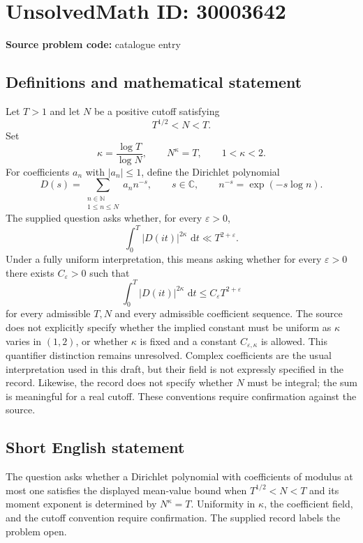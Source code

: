 \documentclass[11pt]{article}
\newcommand{\N}{\mathbb{N}}
\newcommand{\C}{\mathbb{C}}
\newcommand{\dd}{\,\mathrm{d}}
\begin{document}
\section*{UnsolvedMath ID: 30003642}
\textbf{Source problem code:} catalogue entry
\subsection{Definitions and mathematical statement}
Let \(T>1\) and let \(N\) be a positive cutoff satisfying
\[
T^{1/2}<N<T.
\]
Set
\[
\kappa=\frac{\log T}{\log N},
\qquad N^{\kappa}=T,
\qquad 1<\kappa<2.
\]
For coefficients \(a_n\) with \(|a_n|\leq 1\), define the Dirichlet polynomial
\[
D(s)=\sum_{\substack{n\in\N\\1\leq n\leq N}}a_n n^{-s},
\qquad s\in\C,
\qquad n^{-s}=\exp(-s\log n).
\]
The supplied question asks whether, for every \(\varepsilon>0\),
\[
\int_0^T |D(it)|^{2\kappa}\,\dd t
\ll T^{2+\varepsilon}.
\]
Under a fully uniform interpretation, this means asking whether for every \(\varepsilon>0\) there exists \(C_{\varepsilon}>0\) such that
\[
\int_0^T |D(it)|^{2\kappa}\,\dd t
\leq C_{\varepsilon}T^{2+\varepsilon}
\]
for every admissible \(T,N\) and every admissible coefficient sequence. The source does not explicitly specify whether the implied constant must be uniform as \(\kappa\) varies in \((1,2)\), or whether \(\kappa\) is fixed and a constant \(C_{\varepsilon,\kappa}\) is allowed. This quantifier distinction remains unresolved. Complex coefficients are the usual interpretation used in this draft, but their field is not expressly specified in the record. Likewise, the record does not specify whether \(N\) must be integral; the sum is meaningful for a real cutoff. These conventions require confirmation against the source.
\subsection{Short English statement}
The question asks whether a Dirichlet polynomial with coefficients of modulus at most one satisfies the displayed mean-value bound when \(T^{1/2}<N<T\) and its moment exponent is determined by \(N^\kappa=T\). Uniformity in \(\kappa\), the coefficient field, and the cutoff convention require confirmation. The supplied record labels the problem open.
\end{document}
